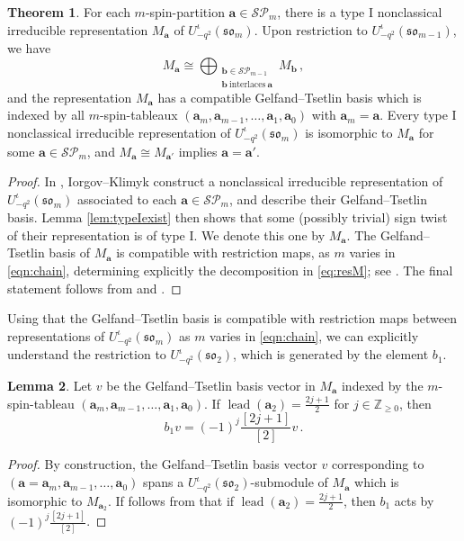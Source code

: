 \documentclass[10pt]{amsart}
\numberwithin{equation}{section}
\theoremstyle{definition}
\newtheorem{thm}{Theorem}[section]
\newtheorem{lem}[thm]{Lemma}
\def\Z{{\mathbb Z}}
\newcommand{\som}[1][m]{\mathfrak{so}_{#1}}
\newcommand{\iqUsom}[1][m]{{U}^{\iota}_{-q^2}(\som[#1])}
\newcommand{\ab}{\mathbf{a}}
\newcommand{\abb}{\mathbf{b}}
\DeclareMathOperator{\lead}{lead}
\newcommand{\SP}{\mathcal{SP}}
\begin{document}
\begin{thm}\label{thm:reptheorytheorem}
For each $m$-spin-partition $\ab\in \SP_m$, there is a 
type I nonclassical irreducible representation $M_{\ab}$ of $\iqUsom$. 
Upon restriction to $\iqUsom[m-1]$, we have
\begin{equation}\label{eq:resM}
M_{\ab}\cong \bigoplus_{\substack{ \abb\in \SP_{m-1} \\\abb \ \text{interlaces} \ \ab}} M_{\abb} \, , 
\end{equation}
and the representation $M_{\ab}$ has a compatible Gelfand--Tsetlin basis 
which is indexed by all $m$-spin-tableaux 
$(\ab_m,\ab_{m-1}, \ldots, \ab_1, \ab_0)$
with $\ab_m = \ab$.
Every type I nonclassical irreducible representation of $\iqUsom$ is isomorphic to $M_{\ab}$ 
for some $\ab\in \SP_m$, 
and $M_{\ab} \cong M_{\ab'}$ implies $\ab = \ab'$.
\end{thm}

\begin{proof}
In \cite[Section 3]{MR2143754}, Iorgov--Klimyk construct a
nonclassical irreducible representation of $\iqUsom$ associated to each $\ab\in \SP_m$, 
and describe their Gelfand--Tsetlin basis.
Lemma \ref{lem:typeIexist} then shows that some (possibly trivial) 
sign twist of their representation is of type I. We denote this one by $M_{\ab}$.
The Gelfand--Tsetlin basis of $M_{\ab}$ is compatible with restriction maps, 
as $m$ varies in \eqref{eqn:chain},
determining explicitly the decomposition in \eqref{eq:resM}; 
see \cite[Remark in Section 3]{MR2143754}.
The final statement follows from \cite{MR1798769} and \cite[Theorem 4]{MR2143754}. 
\end{proof}

Using that the Gelfand--Tsetlin basis is compatible with restriction maps between representations of $\iqUsom$ 
as $m$ varies in \eqref{eqn:chain}, we can explicitly understand the restriction to 
${U}^{\iota}_{-q^2}(\som[2])$, which is generated by the element $b_1$. 

\begin{lem}\label{lem:b1restriction}
Let $v$ be the Gelfand--Tsetlin basis vector in $M_{\ab}$ 
indexed by the $m$-spin-tableau 
$(\ab_m,\ab_{m-1}, \ldots, \ab_1, \ab_0)$.
If $\lead(\ab_2)=\frac{2j+1}{2}$ for $j \in \Z_{\ge 0}$, then
\[
b_1 v = (-1)^j \frac{[2j+1]}{[2]} v \, .
\]
\end{lem}
\begin{proof}
By construction, the Gelfand--Tsetlin basis vector $v$ corresponding to 
$(\ab=\ab_m,\ab_{m-1}, \ldots, \ab_0)$
spans a $\iqUsom[2]$-submodule of $M_{\ab}$ 
which is isomorphic to $M_{\ab_2}$. 
If follows from \cite[Equations (14) and (15)]{MR2143754} 
that if $\lead(\ab_2) = \frac{2j+1}{2}$, then $b_1$ acts by $(-1)^j \frac{[2j+1]}{[2]}$.
\end{proof}
\end{document}
